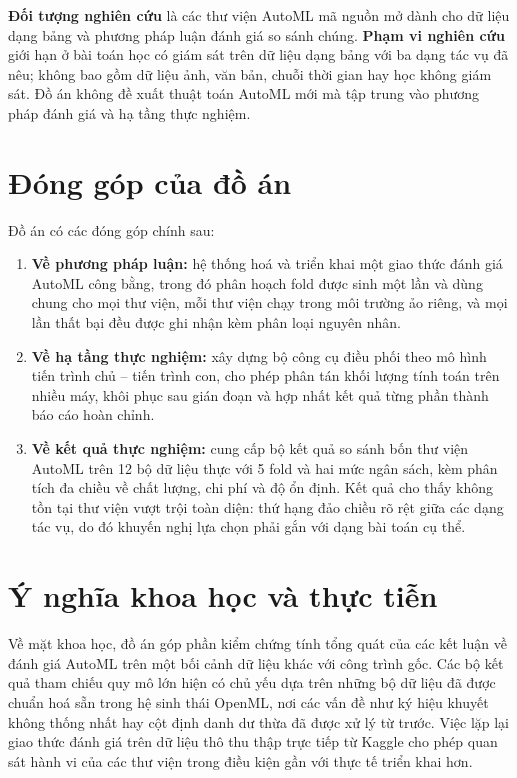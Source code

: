 \noindent\textbf{Đối tượng nghiên cứu} là các thư viện AutoML mã nguồn mở dành cho
dữ liệu dạng bảng và phương pháp luận đánh giá so sánh chúng.
\textbf{Phạm vi nghiên cứu} giới hạn ở bài toán học có giám sát trên dữ liệu dạng
bảng với ba dạng tác vụ đã nêu; không bao gồm dữ liệu ảnh, văn bản, chuỗi thời
gian hay học không giám sát. Đồ án không đề xuất thuật toán AutoML mới mà tập
trung vào phương pháp đánh giá và hạ tầng thực nghiệm.

\section{Đóng góp của đồ án}
\label{sec:donggop}
Đồ án có các đóng góp chính sau:
\begin{enumerate}
    \item \textbf{Về phương pháp luận:} hệ thống hoá và triển khai một giao thức
    đánh giá AutoML công bằng, trong đó phân hoạch fold được sinh một lần và dùng
    chung cho mọi thư viện, mỗi thư viện chạy trong môi trường ảo riêng, và mọi
    lần thất bại đều được ghi nhận kèm phân loại nguyên nhân.
    \item \textbf{Về hạ tầng thực nghiệm:} xây dựng bộ công cụ điều phối theo mô
    hình tiến trình chủ -- tiến trình con, cho phép phân tán khối lượng tính toán
    trên nhiều máy, khôi phục sau gián đoạn và hợp nhất kết quả từng phần thành
    báo cáo hoàn chỉnh.
    \item \textbf{Về kết quả thực nghiệm:} cung cấp bộ kết quả so sánh bốn thư
    viện AutoML trên 12 bộ dữ liệu thực với 5 fold và hai mức ngân sách, kèm phân
    tích đa chiều về chất lượng, chi phí và độ ổn định. Kết quả cho thấy không tồn
    tại thư viện vượt trội toàn diện: thứ hạng đảo chiều rõ rệt giữa các dạng tác
    vụ, do đó khuyến nghị lựa chọn phải gắn với dạng bài toán cụ thể.
\end{enumerate}

\section{Ý nghĩa khoa học và thực tiễn}
\label{sec:ynghia}
Về mặt khoa học, đồ án góp phần kiểm chứng tính tổng quát của các kết luận về đánh
giá AutoML trên một bối cảnh dữ liệu khác với công trình gốc. Các bộ kết quả tham
chiếu quy mô lớn hiện có chủ yếu dựa trên những bộ dữ liệu đã được chuẩn hoá sẵn
trong hệ sinh thái OpenML, nơi các vấn đề như ký hiệu khuyết không thống nhất hay
cột định danh dư thừa đã được xử lý từ trước. Việc lặp lại giao thức đánh giá trên
dữ liệu thô thu thập trực tiếp từ Kaggle cho phép quan sát hành vi của các thư
viện trong điều kiện gần với thực tế triển khai hơn.

